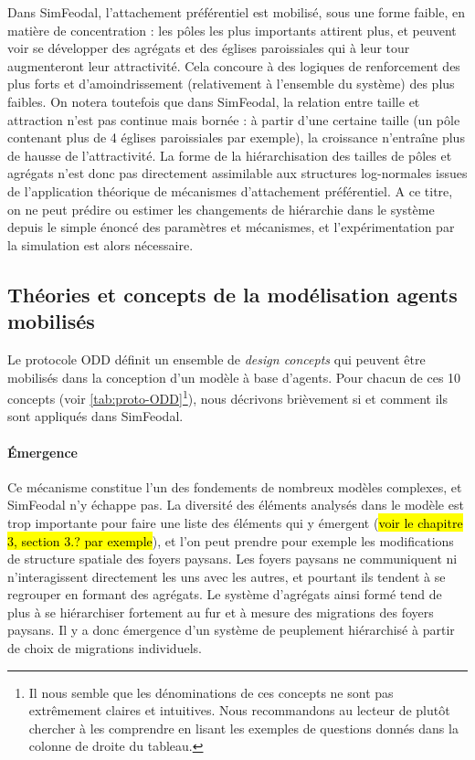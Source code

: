 Dans SimFeodal, l'attachement préférentiel est mobilisé, sous une forme faible, en matière de concentration : les pôles les plus importants attirent plus, et peuvent voir se développer des agrégats et des églises paroissiales qui à leur tour augmenteront leur attractivité.
Cela concoure à des logiques de renforcement des plus forts et d'amoindrissement (relativement à l'ensemble du système) des plus faibles.
On notera toutefois que dans SimFeodal, la relation entre taille et attraction n'est pas continue mais bornée : à partir d'une certaine taille (un pôle contenant plus de 4 églises paroissiales par exemple), la croissance n'entraîne plus de hausse de l'attractivité.
La forme de la hiérarchisation des tailles de pôles et agrégats n'est donc pas directement assimilable aux structures log-normales issues de l'application théorique de mécanismes d'attachement préférentiel.
A ce titre, on ne peut prédire ou estimer les changements de hiérarchie dans le système depuis le simple énoncé des paramètres et mécanismes, et l'expérimentation par la simulation est alors nécessaire.

\clearpage
\subsection{Théories et concepts de la modélisation agents mobilisés}

Le protocole ODD définit un ensemble de \textit{design concepts} qui peuvent être mobilisés dans la conception d'un modèle à base d'agents.
Pour chacun de ces 10 concepts (voir \cref{tab:proto-ODD}\footnote{
Il nous semble que les dénominations de ces concepts ne sont pas extrêmement claires et intuitives.
Nous recommandons au lecteur de plutôt chercher à les comprendre en lisant les exemples de questions donnés dans la colonne de droite du tableau.
}), nous décrivons brièvement si et comment ils sont appliqués dans SimFeodal.

\paragraph{Émergence} Ce mécanisme constitue l'un des fondements de nombreux modèles complexes, et SimFeodal n'y échappe pas.
La diversité des éléments analysés dans le modèle est trop importante pour faire une liste des éléments qui y émergent (\hl{voir le chapitre 3, section 3.? par exemple}), et l'on peut prendre pour exemple les modifications de structure spatiale des foyers paysans.
Les foyers paysans ne communiquent ni n'interagissent directement les uns avec les autres, et pourtant ils tendent à se regrouper en formant des agrégats.
Le système d'agrégats ainsi formé tend de plus à se hiérarchiser fortement au fur et à mesure des migrations des foyers paysans.
Il y a donc émergence d'un système de peuplement hiérarchisé à partir de choix de migrations individuels.

